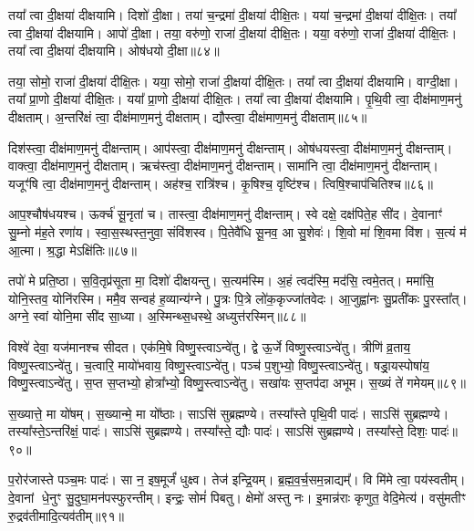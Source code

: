 तया᳚ त्वा दी॒क्षया॑ दीक्षयामि।
दिशो॑ दी॒क्षा।
तया॑ च॒न्द्रमा॑ दी॒क्षया॑ दीक्षि॒तः।
यया॑ च॒न्द्रमा॑ दी॒क्षया॑ दीक्षि॒तः।
तया᳚ त्वा दी॒क्षया॑ दीक्षयामि।
आपो॑ दी॒क्षा।
तया॒ वरु॑णो॒ राजा॑ दी॒क्षया॑ दीक्षि॒तः।
यया॒ वरु॑णो॒ राजा॑ दी॒क्षया॑ दीक्षि॒तः।
तया᳚ त्वा दी॒क्षया॑ दीक्षयामि।
ओष॑धयो दी॒क्षा॥८४॥\ip

तया॒ सोमो॒ राजा॑ दी॒क्षया॑ दीक्षि॒तः।
यया॒ सोमो॒ राजा॑ दी॒क्षया॑ दीक्षि॒तः।
तया᳚ त्वा दी॒क्षया॑ दीक्षयामि।
वाग्दी॒क्षा।
तया᳚ प्रा॒णो दी॒क्षया॑ दीक्षि॒तः।
यया᳚ प्रा॒णो दी॒क्षया॑ दीक्षि॒तः।
तया᳚ त्वा दी॒क्षया॑ दीक्षयामि।
पृ॒थि॒वी त्वा॒ दीक्ष॑\-माण॒\-मनु॑ दीक्षताम्।
अ॒न्तरि॑क्षं त्वा॒ दीक्ष॑\-माण॒\-मनु॑ दीक्षताम्।
द्यौस्त्वा॒ दीक्ष॑\-माण॒\-मनु॑ दीक्षताम्॥८५॥\ip

दिश॑स्त्वा॒ दीक्ष॑\-माण॒\-मनु॑ दीक्षन्ताम्।
आप॑स्त्वा॒ दीक्ष॑\-माण॒\-मनु॑ दीक्षन्ताम्।
ओष॑धयस्त्वा॒ दीक्ष॑\-माण॒\-मनु॑ दीक्षन्ताम्।
वाक्त्वा॒ दीक्ष॑\-माण॒\-मनु॑ दीक्षताम्।
ऋच॑स्त्वा॒ दीक्ष॑\-माण॒\-मनु॑ दीक्षन्ताम्।
सामा॑नि त्वा॒ दीक्ष॑\-माण॒\-मनु॑ दीक्षन्ताम्।
यजूꣳ॑षि त्वा॒ दीक्ष॑\-माण॒\-मनु॑ दीक्षन्ताम्।
अह॑श्च॒ रात्रि॑श्च।
कृ॒षिश्च॒ वृष्टि॑श्च।
त्विषि॒श्चाप॑चितिश्च॥८६॥\ip

आप॒श्चौष॑धयश्च।
ऊर्क्च॑ सू॒नृता॑ च।
तास्त्वा॒ दीक्ष॑\-माण॒\-मनु॑ दीक्षन्ताम्।
स्वे दक्षे॒ दक्ष॑पिते॒ह सी॑द।
दे॒वानाꣳ॑ सु॒म्नो म॑ह॒ते रणा॑य।
स्वा॒स॒स्थस्त॒नुवा॒ संवि॑शस्व।
पि॒तेवै॑धि सू॒नव॒ आ सु॒शेवः॑।
शि॒वो मा॑ शि॒वमा वि॑श।
स॒त्यं म॑ आ॒त्मा।
श्र॒द्धा मेऽक्षि॑तिः॥८७॥\ip

तपो॑ मे प्रति॒ष्ठा।
स॒वि॒तृप्र॑सूता मा॒ दिशो॑ दीक्षयन्तु।
स॒त्यम॑स्मि।
अ॒हं त्वद॑स्मि॒ मद॑सि॒ त्वमे॒तत्।
ममा॑सि॒ योनि॒स्तव॒ योनि॑रस्मि।
ममै॒व सन्वह॑ ह॒व्यान्य॑ग्ने।
पु॒त्रः पि॒त्रे लो॑क॒कृज्जा॑तवेदः।
आ॒जुह्वा॑नः सु॒प्रती॑कः पु॒रस्ता᳚त्।
अग्ने॒ स्वां योनि॒मा सी॑द सा॒ध्या।
अ॒स्मिन्थ्स॒धस्थे॒ अध्युत्त॑रस्मिन्॥८८॥\ip

विश्वे॑ देवा॒ यज॑मानश्च सीदत।
एक॑मि॒षे विष्णु॒स्त्वा\-ऽन्वे॑तु।
द्वे ऊ॒र्जे विष्णु॒स्त्वा\-ऽन्वे॑तु।
त्रीणि॑ व्र॒ताय॒ विष्णु॒स्त्वा\-ऽन्वे॑तु।
च॒त्वारि॒ मायो॑भवाय॒ विष्णु॒स्त्वा\-ऽन्वे॑तु।
पञ्च॑ प॒शुभ्यो॒ विष्णु॒स्त्वा\-ऽन्वे॑तु।
षड्रा॒यस्पोषा॑य॒ विष्णु॒स्त्वा\-ऽन्वे॑तु।
स॒प्त स॒प्तभ्यो॒ होत्रा᳚भ्यो॒ विष्णु॒स्त्वा\-ऽन्वे॑तु।
सखा॑यः स॒प्तप॑दा अभूम।
स॒ख्यं ते॑ गमेयम्॥८९॥\ip

स॒ख्यात्ते॒ मा यो॑षम्।
स॒ख्यान्मे॒ मा यो᳚ष्ठाः।
साऽसि॑ सुब्रह्मण्ये।
तस्या᳚स्ते पृथि॒वी पादः॑।
साऽसि॑ सुब्रह्मण्ये।
तस्या᳚स्ते॒\-ऽन्तरि॑क्षं॒ पादः॑।
साऽसि॑ सुब्रह्मण्ये।
तस्या᳚स्ते॒ द्यौः पादः॑।
साऽसि॑ सुब्रह्मण्ये।
तस्या᳚स्ते॒ दिशः॒ पादः॑॥९०॥\ip

प॒रोर॑जास्ते पञ्च॒मः पादः॑।
सा न॒ इष॒मूर्जं॑ धुक्ष्व।
तेज॑ इन्द्रि॒यम्।
ब्र॒ह्म॒व॒र्च॒सम॒न्नाद्यम्᳚।
वि मि॑मे त्वा॒ पय॑स्वतीम्।
दे॒वानां धे॒नुꣳ सु॒दुघा॒मन॑पस्फुरन्तीम्।
इन्द्रः॒ सोमं॑ पिबतु।
क्षेमो॑ अस्तु नः।
इ॒मान्न॑राः कृणुत॒ वेदि॒मेत्य॑।
वसु॑मतीꣳ रु॒द्रव॑तीमादि॒त्यव॑तीम्॥९१॥\ip

